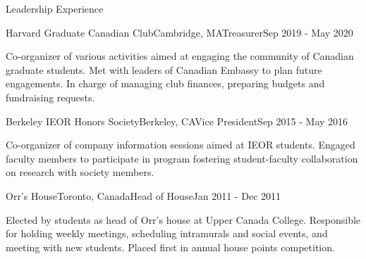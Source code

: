 \documentclass{resume} %
\begin{document}
\begin{rSection}{Leadership Experience}

\begin{rSubsection}{Harvard Graduate Canadian Club}{Cambridge, MA}{Treasurer}{Sep 2019 - May 2020}

\item Co-organizer of various activities aimed at engaging the community of Canadian graduate students. Met with leaders of Canadian Embassy to plan future engagements. In charge of managing club finances, preparing budgets and fundraising requests.  

\end{rSubsection}

\begin{rSubsection}{Berkeley IEOR Honors Society}{Berkeley, CA}{Vice President}{Sep 2015 - May 2016}

\item Co-organizer of company information sessions aimed at IEOR students. Engaged faculty members to participate in program fostering student-faculty collaboration on research with society members.

\end{rSubsection}

\begin{rSubsection}{Orr's House}{Toronto, Canada}{Head of House}{Jan 2011 - Dec 2011}

\item Elected by students as head of Orr's house at Upper Canada College. Responsible for holding weekly meetings, scheduling intramurals and social events, and meeting with new students. Placed first in annual house points competition.
\end{rSubsection}


\end{rSection}

\end{document}
